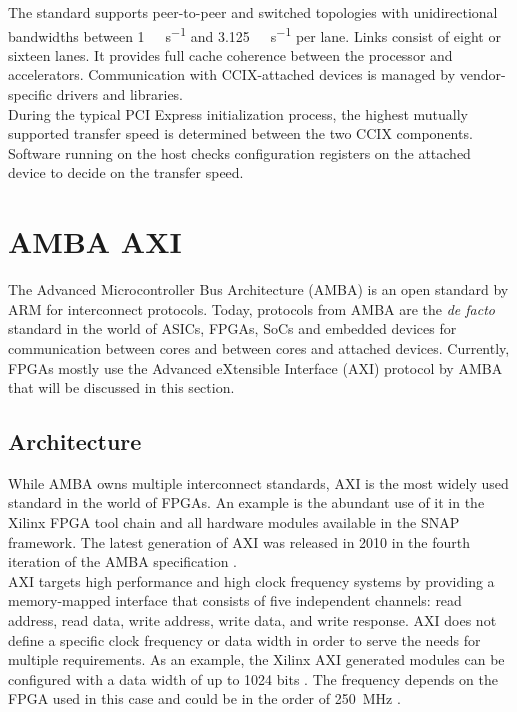 The standard supports peer-to-peer and switched topologies with unidirectional bandwidths between \SI{1}{\giga\bit\per\second} and \SI{3.125}{\giga\bit\per\second} per lane. Links consist of eight or sixteen lanes. It provides full cache coherence between the processor and accelerators. Communication with CCIX-attached devices is managed by vendor-specific drivers and libraries.\\
During the typical PCI Express initialization process, the highest mutually supported transfer speed is determined between the two CCIX components. Software running on the host checks configuration registers on the attached device to decide on the transfer speed.





\section{AMBA AXI}
The Advanced Microcontroller Bus Architecture (AMBA) is an open standard by ARM for interconnect protocols. Today, protocols from AMBA are the \textit{de facto} standard in the world of ASICs, FPGAs, SoCs and embedded devices for communication between cores and between cores and attached devices. Currently, FPGAs mostly use the Advanced eXtensible Interface (AXI) protocol by AMBA that will be discussed in this section.



\subsection{Architecture}
While AMBA owns multiple interconnect standards, AXI is the most widely used standard in the world of FPGAs. An example is the abundant use of it in the Xilinx FPGA tool chain and all hardware modules available in the SNAP framework. The latest generation of AXI was released in 2010 in the fourth iteration of the AMBA specification \cite{amba4}.\\
AXI targets high performance and high clock frequency systems by providing a memory-mapped interface that consists of five independent channels: read address, read data, write address, write data, and write response. AXI does not define a specific clock frequency or data width in order to serve the needs for multiple requirements. As an example, the Xilinx AXI generated modules can be configured with a data width of up to 1024 bits \cite{xilinx-pg059}. The frequency depends on the FPGA used in this case and could be in the order of \SI{250}{\mega\hertz} \cite{fuchs}.



